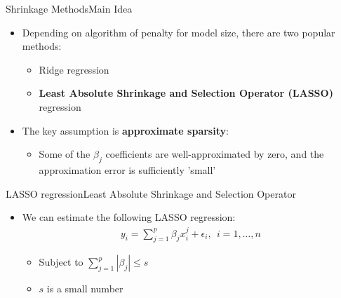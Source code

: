 \documentclass[dvipsnames,hyperref={pdfpagelabels=false}]{beamer}
\begin{document}
	


	\begin{frame}{Shrinkage Methods}{Main Idea}
\begin{itemize}
	
	\item Depending on algorithm of penalty for model size, there are two popular methods: 
	\vspace{0.2cm}
	\begin{itemize}
		\item Ridge regression
		\vspace{0.2cm}
		\item \textbf{Least Absolute Shrinkage and Selection Operator (LASSO)} regression
				\vspace{0.2cm}
	\end{itemize}
	
		\item The key assumption is \textbf{approximate sparsity}: 
	\vspace{0.2cm}
	\begin{itemize}
		\item Some of the $\beta_{j}$ coefficients are well-approximated by zero, and the approximation error is sufficiently 'small'
	\end{itemize}
\end{itemize}
\end{frame}
	


\begin{frame}{LASSO regression}{Least Absolute Shrinkage and Selection Operator}
	\begin{itemize}
		\item We can estimate the following LASSO regression:
		\vspace{0.2cm}
		\begin{eqnarray*}
			y_{i} = \sum^{p}_{j=1} \beta_{j} x^{j}_{i}  + \epsilon_{i},  \ \ i=1, \ldots ,n
		\end{eqnarray*}	
		
		\begin{itemize}
			\vspace{0.2cm}
			\item Subject to $\sum^{p}_{j=1} |\beta_{j}| \leq s$
			\vspace{0.2cm}
			\item $s$ is a small number		
		\end{itemize}	
	\end{itemize}
\end{frame}
\end{document}
